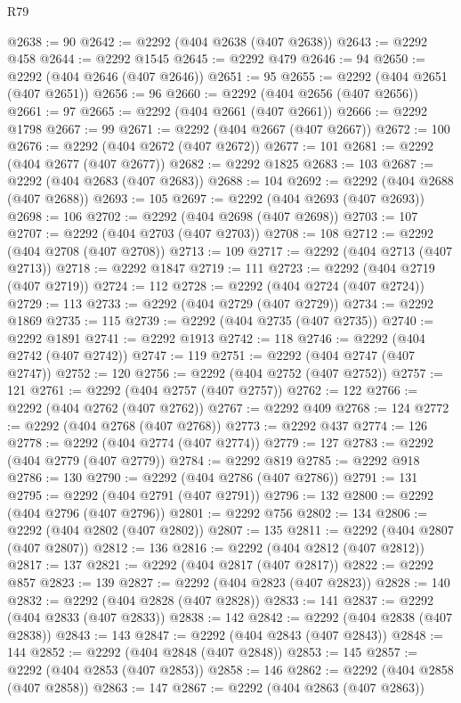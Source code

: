\begin{lexlean}{R79}
\begin{coremodule}
@2638 := 90
@2642 := @2292 (@404 @2638 (@407 @2638))
@2643 := @2292 @458
@2644 := @2292 @1545
@2645 := @2292 @479
@2646 := 94
@2650 := @2292 (@404 @2646 (@407 @2646))
@2651 := 95
@2655 := @2292 (@404 @2651 (@407 @2651))
@2656 := 96
@2660 := @2292 (@404 @2656 (@407 @2656))
@2661 := 97
@2665 := @2292 (@404 @2661 (@407 @2661))
@2666 := @2292 @1798
@2667 := 99
@2671 := @2292 (@404 @2667 (@407 @2667))
@2672 := 100
@2676 := @2292 (@404 @2672 (@407 @2672))
@2677 := 101
@2681 := @2292 (@404 @2677 (@407 @2677))
@2682 := @2292 @1825
@2683 := 103
@2687 := @2292 (@404 @2683 (@407 @2683))
@2688 := 104
@2692 := @2292 (@404 @2688 (@407 @2688))
@2693 := 105
@2697 := @2292 (@404 @2693 (@407 @2693))
@2698 := 106
@2702 := @2292 (@404 @2698 (@407 @2698))
@2703 := 107
@2707 := @2292 (@404 @2703 (@407 @2703))
@2708 := 108
@2712 := @2292 (@404 @2708 (@407 @2708))
@2713 := 109
@2717 := @2292 (@404 @2713 (@407 @2713))
@2718 := @2292 @1847
@2719 := 111
@2723 := @2292 (@404 @2719 (@407 @2719))
@2724 := 112
@2728 := @2292 (@404 @2724 (@407 @2724))
@2729 := 113
@2733 := @2292 (@404 @2729 (@407 @2729))
@2734 := @2292 @1869
@2735 := 115
@2739 := @2292 (@404 @2735 (@407 @2735))
@2740 := @2292 @1891
@2741 := @2292 @1913
@2742 := 118
@2746 := @2292 (@404 @2742 (@407 @2742))
@2747 := 119
@2751 := @2292 (@404 @2747 (@407 @2747))
@2752 := 120
@2756 := @2292 (@404 @2752 (@407 @2752))
@2757 := 121
@2761 := @2292 (@404 @2757 (@407 @2757))
@2762 := 122
@2766 := @2292 (@404 @2762 (@407 @2762))
@2767 := @2292 @409
@2768 := 124
@2772 := @2292 (@404 @2768 (@407 @2768))
@2773 := @2292 @437
@2774 := 126
@2778 := @2292 (@404 @2774 (@407 @2774))
@2779 := 127
@2783 := @2292 (@404 @2779 (@407 @2779))
@2784 := @2292 @819
@2785 := @2292 @918
@2786 := 130
@2790 := @2292 (@404 @2786 (@407 @2786))
@2791 := 131
@2795 := @2292 (@404 @2791 (@407 @2791))
@2796 := 132
@2800 := @2292 (@404 @2796 (@407 @2796))
@2801 := @2292 @756
@2802 := 134
@2806 := @2292 (@404 @2802 (@407 @2802))
@2807 := 135
@2811 := @2292 (@404 @2807 (@407 @2807))
@2812 := 136
@2816 := @2292 (@404 @2812 (@407 @2812))
@2817 := 137
@2821 := @2292 (@404 @2817 (@407 @2817))
@2822 := @2292 @857
@2823 := 139
@2827 := @2292 (@404 @2823 (@407 @2823))
@2828 := 140
@2832 := @2292 (@404 @2828 (@407 @2828))
@2833 := 141
@2837 := @2292 (@404 @2833 (@407 @2833))
@2838 := 142
@2842 := @2292 (@404 @2838 (@407 @2838))
@2843 := 143
@2847 := @2292 (@404 @2843 (@407 @2843))
@2848 := 144
@2852 := @2292 (@404 @2848 (@407 @2848))
@2853 := 145
@2857 := @2292 (@404 @2853 (@407 @2853))
@2858 := 146
@2862 := @2292 (@404 @2858 (@407 @2858))
@2863 := 147
@2867 := @2292 (@404 @2863 (@407 @2863))

\end{coremodule}
\end{lexlean}
